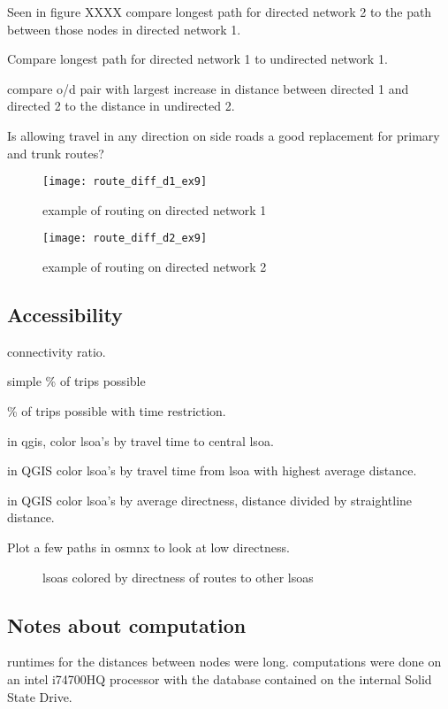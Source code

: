 Seen in figure XXXX  compare longest path for directed network 2 to the path between those nodes in directed network 1. 

Compare longest path for directed network 1 to undirected network 1. 

compare o/d pair with largest increase in distance between directed 1 and directed 2 to the distance in undirected 2. 

Is allowing travel in any direction on side roads a good replacement for primary and trunk routes?


\begin{figure}
\centering
\texttt{[image: route\_diff\_d1\_ex9]}
\caption{example of routing on directed network 1}
\label{fig:routing_1}
\end{figure}

\begin{figure}
\centering
\texttt{[image: route\_diff\_d2\_ex9]}
\caption{example of routing on directed network 2}
\label{fig:routing_1}
\end{figure}

\subsection{Accessibility}

connectivity ratio. 

simple \% of trips possible

\% of trips possible with time restriction. 

in qgis, color lsoa's by travel time to central lsoa. 

in QGIS color lsoa's by travel time from lsoa with highest average distance. 

in QGIS color lsoa's by  average directness, distance divided by straightline distance. 

Plot a few paths in osmnx to look at low directness. 


\begin{figure}
\centering
\caption{lsoas colored by directness of routes to other lsoas}
\label{fig:lsoa_directness}
\end{figure}


\subsection{Notes about computation}

runtimes for the distances between nodes were long. computations were done on an intel i74700HQ processor with the database contained on the internal Solid State Drive. 

